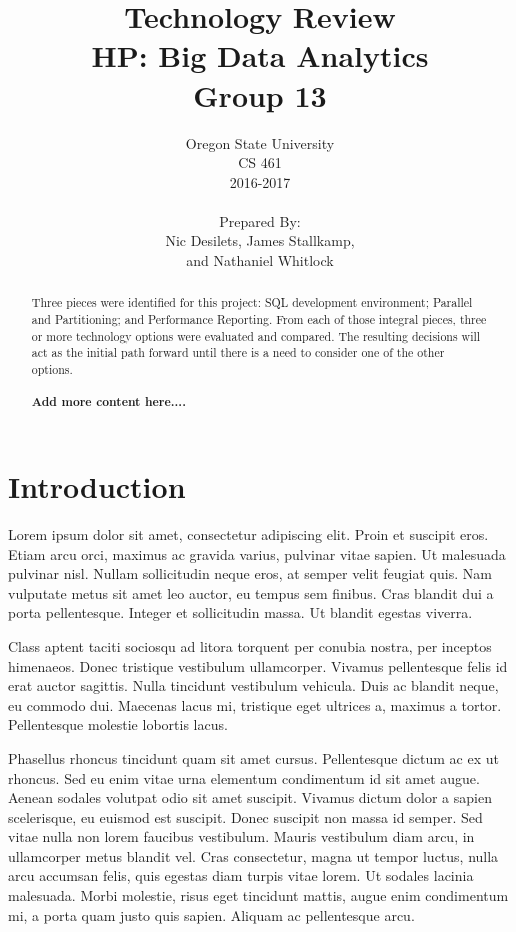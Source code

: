\documentclass[draftclsnofoot, onecolumn, compsoc, 10pt]{IEEEtran}
\title{\Huge Technology Review\\\large HP: Big Data Analytics\\Group 13}
\author{Oregon State University\\CS 461\\2016-2017\\\\Prepared By:\\Nic Desilets, James Stallkamp,\\and Nathaniel Whitlock}
\begin{document}
\begin{titlingpage}
    \maketitle 
    \begin{abstract}
		\noindent Three pieces were identified for this project: SQL development environment; Parallel and Partitioning; and Performance Reporting.
        From each of those integral pieces, three or more technology options were evaluated and compared.
        The resulting decisions will act as the initial path forward until there is a need to consider one of the other options.
        \\\\\bf Add more content here....
    \end{abstract}
\end{titlingpage}

\tableofcontents
\pagebreak

\section{Introduction}
Lorem ipsum dolor sit amet, consectetur adipiscing elit. Proin et suscipit eros. Etiam arcu orci, maximus ac gravida varius, pulvinar vitae sapien. Ut malesuada pulvinar nisl. Nullam sollicitudin neque eros, at semper velit feugiat quis. Nam vulputate metus sit amet leo auctor, eu tempus sem finibus. Cras blandit dui a porta pellentesque. Integer et sollicitudin massa. Ut blandit egestas viverra.

Class aptent taciti sociosqu ad litora torquent per conubia nostra, per inceptos himenaeos. Donec tristique vestibulum ullamcorper. Vivamus pellentesque felis id erat auctor sagittis. Nulla tincidunt vestibulum vehicula. Duis ac blandit neque, eu commodo dui. Maecenas lacus mi, tristique eget ultrices a, maximus a tortor. Pellentesque molestie lobortis lacus.

Phasellus rhoncus tincidunt quam sit amet cursus. Pellentesque dictum ac ex ut rhoncus. Sed eu enim vitae urna elementum condimentum id sit amet augue. Aenean sodales volutpat odio sit amet suscipit. Vivamus dictum dolor a sapien scelerisque, eu euismod est suscipit. Donec suscipit non massa id semper. Sed vitae nulla non lorem faucibus vestibulum. Mauris vestibulum diam arcu, in ullamcorper metus blandit vel. Cras consectetur, magna ut tempor luctus, nulla arcu accumsan felis, quis egestas diam turpis vitae lorem. Ut sodales lacinia malesuada. Morbi molestie, risus eget tincidunt mattis, augue enim condimentum mi, a porta quam justo quis sapien. Aliquam ac pellentesque arcu.
\end{document}
